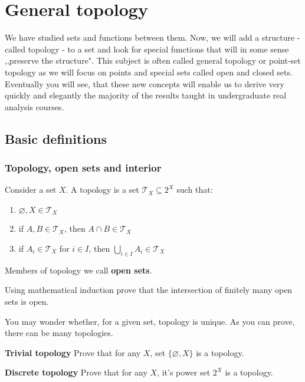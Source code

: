 \chapter{General topology}
\label{general_topology}
We have studied sets and functions between them. Now, we will add
a structure - called topology - to a set and look for special
functions that will in some sense ,,preserve the structure". This
subject is often called general topology or point-set topology as
we will focus on points and special sets called open and closed sets.
Eventually you will see, that these new concepts will enable us
to derive very quickly and elegantly the majority of the results
taught in undergraduate real analysis courses.

\section{Basic definitions}
\subsection{Topology, open sets and interior}
Consider a set $X$. A topology is a set $\mathcal{T}_X \subseteq 2^X $ such that:
\begin{enumerate}
	\item $\varnothing, X\in \mathcal{T}_X$
	\item if $A, B\in \mathcal{T}_X$, then $A\cap B\in \mathcal{T}_X$
	\item if $A_i\in \mathcal{T}_X$ for $i\in I$, then $\bigcup_{i\in I} A_i\in \mathcal T_X$
\end{enumerate}
Members of topology we call \textbf{open sets}.

\begin{prob}
	Using mathematical induction prove that the intersection of finitely many open sets is open.
\end{prob}

You may wonder whether, for a given set, topology is unique. As you can prove, there can be many topologies.

\begin{prob}
	\textbf{Trivial topology} Prove that for any $X$, set $\{\varnothing, X\}$ is a topology.
\end{prob}

\begin{prob}
	\textbf{Discrete topology} Prove that for any $X$, it's power set $2^X$ is a topology.
\end{prob}


